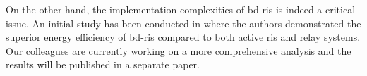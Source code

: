 \documentclass[
	fontsize=11pt,
	paper=a4,
	foldmarks=false
]{scrartcl}
\begin{document}
\begin{reviewer}
{		On the other hand, the implementation complexities of \gls{bd}-\gls{ris} is indeed a critical issue.
		An initial study has been conducted in \cite{Zhou2023} where the authors demonstrated the superior energy efficiency of \gls{bd}-\gls{ris} compared to both active \gls{ris} and relay systems.
		Our colleagues are currently working on a more comprehensive analysis and the results will be published in a separate paper.



}
\end{reviewer}
\end{document}
